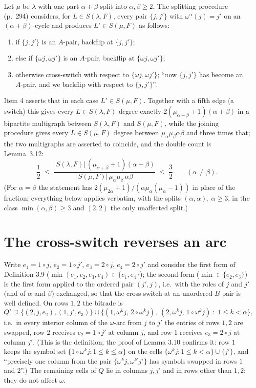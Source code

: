 \documentclass[11pt]{article}
\theoremstyle{remark}
\begin{document}
Let $\mu$ be $\lambda$ with one part $\alpha+\beta$ split into
$\alpha,\beta\ge2$.  The splitting procedure (p.~294) considers, for
$L\in S(\lambda,F)$, every pair $\{j,j'\}$ with $\omega^\alpha(j)=j'$
on an $(\alpha+\beta)$-cycle and produces $L'\in S(\mu,F)$ as follows:
\begin{enumerate}
\item[1.] if $\{j,j'\}$ is an $A$-pair, backflip at $\{j,j'\}$;
\item[2.] else if $\{\omega j,\omega j'\}$ is an $A$-pair, backflip at
$\{\omega j,\omega j'\}$;
\item[3.] otherwise cross-switch with respect to $\{\omega j,\omega j'\}$;
``now $\{j,j'\}$ has become an $A$-pair, and we backflip with respect to
$\{j,j'\}$''.
\end{enumerate}
Item 4 asserts that in each case $L'\in S(\mu,F)$.  Together with a
fifth edge (a switch) this gives every $L\in S(\lambda,F)$ degree
exactly $2(\mu_{\alpha+\beta}+1)(\alpha+\beta)$ in a bipartite
multigraph between $S(\lambda,F)$ and $S(\mu,F)$, while the joining
procedure gives every $L\in S(\mu,F)$ degree between
$\mu_\alpha\mu_\beta\alpha\beta$ and three times that; the two
multigraphs are asserted to coincide, and the double count is
Lemma~3.12:
\begin{equation}\label{eq:L312}
\frac12\;\le\;\frac{|S(\lambda,F)|\,(\mu_{\alpha+\beta}+1)(\alpha+\beta)}{|S(\mu,F)|\,\mu_\alpha\mu_\beta\,\alpha\beta}\;\le\;\frac32
\qquad(\alpha\ne\beta).
\end{equation}
(For $\alpha=\beta$ the statement has $2(\mu_{2\alpha}+1)/(\alpha\mu_\alpha(\mu_\alpha-1))$
in place of the fraction; everything below applies verbatim, with the
splits $(\alpha,\alpha)$, $\alpha\ge3$, in the class
$\min(\alpha,\beta)\ge3$ and $(2,2)$ the only unaffected split.)

\section{The cross-switch reverses an arc}

Write $e_1=1\circ j$, $e_2=1\circ j'$, $e_3=2\circ j$, $e_4=2\circ j'$
and consider the first form of Definition 3.9
($\min(e_1,e_2,e_3,e_4)\in\{e_1,e_4\}$); the second form
($\min\in\{e_2,e_3\}$) is the first form applied to the ordered pair
$(j',j)$, i.e.\ with the roles of $j$ and $j'$ (and of $\alpha$ and
$\beta$) exchanged, so that the cross-switch at an unordered $B$-pair
is well defined.  On rows $1,2$ the bitrade is
\[
Q'\supseteq\{(2,j,e_2),(1,j',e_3)\}\cup
\{(1,\omega^kj,\,2\circ\omega^kj),\ (2,\omega^kj,\,1\circ\omega^kj)\;:\;1\le k<\alpha\},
\]
i.e.\ in every interior column of the $\omega$-arc from $j$ to $j'$ the
entries of rows $1,2$ are swapped, row $2$ receives $e_2=1\circ j'$ at
column $j$, and row $1$ receives $e_3=2\circ j$ at column $j'$.  (This
is the definition; the proof of Lemma 3.10 confirms it: row $1$ keeps
the symbol set $\{1\circ\omega^kj:1\le k\le\alpha\}$ on the cells
$\{\omega^kj:1\le k<\alpha\}\cup\{j'\}$, and ``precisely one column
from the pair $\{\omega^kj,\omega^{k'}j'\}$ has symbols swapped in rows
$1$ and $2$''.)  The remaining cells of $Q$ lie in columns $j,j'$ and
in rows other than $1,2$; they do not affect $\omega$.
\end{document}
